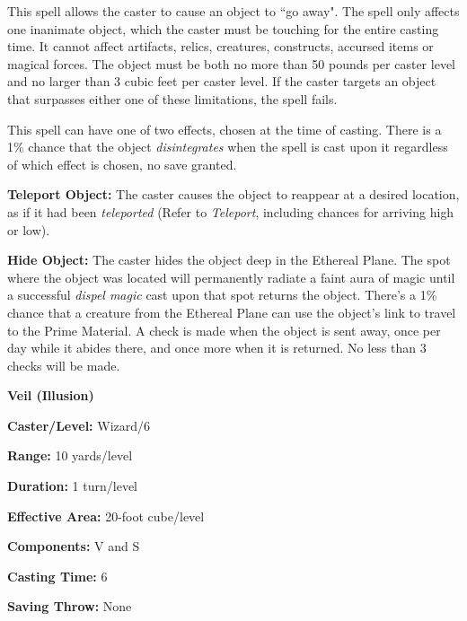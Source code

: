\begin{multicols}{2}
\begin{minipage}{\columnwidth}
\end{minipage}

This spell allows the caster to cause an object to ``go away".  The spell only affects one inanimate object, which the caster must be touching for the entire casting time.  It cannot affect artifacts, relics, creatures, constructs, accursed items or magical forces.  The object must be both no more than 50 pounds per caster level and no larger than 3 cubic feet per caster level.  If the caster targets an object that surpasses either one of these limitations, the spell fails. 

This spell can have one of two effects, chosen at the time of casting.  There is a 1\% chance that the object \textit{disintegrates} when the spell is cast upon it regardless of which effect is chosen, no save granted.

\textbf{Teleport Object:} The caster causes the object to reappear at a desired location, as if it had been \textit{teleported} (Refer to \textit{Teleport}, including chances for arriving high or low).

\textbf{Hide Object:} The caster hides the object deep in the Ethereal Plane.  The spot where the object was located will permanently radiate a faint aura of magic until a successful \textit{dispel magic} cast upon that spot returns the object.  There's a 1\% chance that a creature from the Ethereal Plane can use the object's link to travel to the Prime Material.  A check is made when the object is sent away, once per day while it abides there, and once more when it is returned.  No less than 3 checks will be made.

\vspace{1em}

\noindent
\begin{minipage}{\columnwidth}

\noindent \textbf{Veil (Illusion)}

\noindent \textbf{Caster/Level:} Wizard/6

\noindent \textbf{Range:} 10 yards/level

\noindent \textbf{Duration:} 1 turn/level

\noindent \textbf{Effective Area:} 20-foot cube/level

\noindent \textbf{Components:} V and S

\noindent \textbf{Casting Time:} 6

\noindent \textbf{Saving Throw:} None

\end{minipage}


\end{multicols}

